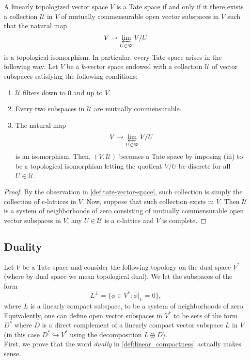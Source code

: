 \begin{proposition}\label{prop:characterization-of-tate-spaces-as-inverse-limits}
	A linearly topologized vector space $V$ is a Tate space if and only if it there exists a collection $\mathscr{U}$ in $V$ of mutually commensurable open vector subspaces in $V$ such that the natural map
	\[
		V \to \varprojlim_{U \in \mathscr{U}} V/U
	\]
	is a topological isomorphism. In particular, every Tate space arises in the following way: Let $V$ be a $k$-vector space endowed with a collection $\mathscr{U}$ of vector subspaces satisfying the following conditions:
	\begin{enumerate}[label = (\roman*)]
		\item $\mathscr{U}$ filters down to $0$ and up to $V$.
		\item Every two subspaces in $\mathscr{U}$ are mutually commensurable.
		\item The natural map
		\[
			V \to \varprojlim_{U\in \mathscr{U}} V/U
		\]
		is an isomorphism. Then, $(V, \mathscr{U})$ becomes a Tate space by imposing (iii) to be a topological isomorphism letting the quotient $V/U$ be discrete for all $U \in \mathscr{U}$.
	\end{enumerate}
	
\end{proposition}
\begin{proof}
	By the observation in \cref{def:tate-vector-space}, such collection is simply the collection of c-lattices in $V$. Now, suppose that such collection exists in $V$. Then $\mathscr{U}$ is a system of neighborhoods of zero consisting of mutually commensurable open vector subspaces in $V$, any $U \in \mathscr{U}$ is a c-lattice and $V$ is complete.
\end{proof}
\subsection{Duality}
Let $V$ be a Tate space and consider the following topology on the dual space $V^{*}$ (where by dual space we mean topological dual). We let the subspaces of the form
\[
	L^{\perp} = \{\phi\in V^{*} \colon \phi\lvert_{L} = 0\},
\]
where $L$ is a linearly compact subspace, to be a system of neighborhoods of zero. Equivalently, one can define open vector subspaces in $V^{*}$ to be sets of the form $D^{*}$ where $D$ is a direct complement of a linearly compact vector subspace $L$ in $V$ (in this case $D^{*} \hookrightarrow V^{*}$ using the decomposition $L\oplus D$).  \\
First, we prove that the word \emph{dually} in \cref{def:linear_compactness} actually makes sense. 

